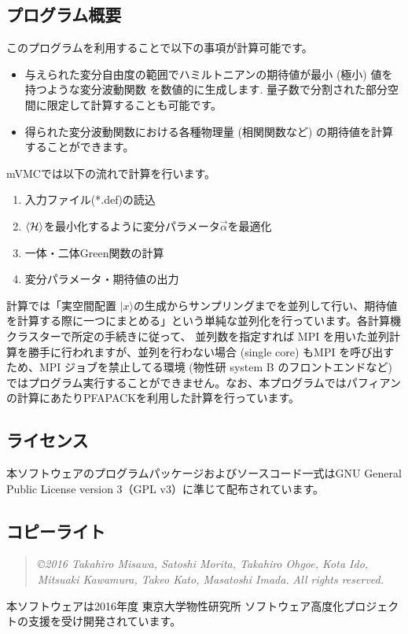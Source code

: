\subsection{プログラム概要}
このプログラムを利用することで以下の事項が計算可能です。
\begin{itemize}
\item{与えられた変分自由度の範囲でハミルトニアンの期待値が最小 (極小) 値を持つような変分波動関数 を数値的に生成します.   量子数で分割された部分空間に限定して計算することも可能です。}
\item{得られた変分波動関数における各種物理量 (相関関数など) の期待値を計算することができます。}
\end{itemize}
mVMCでは以下の流れで計算を行います。
\begin{enumerate}
\item{入力ファイル(*.def)の読込}
\item{$\langle {\cal H} \rangle$を最小化するように変分パラメータ$\vec{\alpha}$を最適化}
\item{一体・二体Green関数の計算}
\item{変分パラメータ・期待値の出力}
\end{enumerate}
計算では「実空間配置 $|x\rangle$の生成からサンプリングまでを並列して行い、期待値を計算する際に一つにまとめる」という単純な並列化を行っています。各計算機クラスターで所定の手続きに従って、 並列数を指定すれば MPI を用いた並列計算を勝手に行われますが、並列を行わない場合 (single core) もMPI を呼び出すため、MPI ジョブを禁止してる環境 (物性研 system B のフロントエンドなど) ではプログラム実行することができません。なお、本プログラムではパフィアンの計算にあたりPFAPACKを利用した計算を行っています\cite{PFAPACK}。

\subsection{ライセンス}
本ソフトウェアのプログラムパッケージおよびソースコード一式はGNU General Public License version 3（GPL v3）に準じて配布されています。

\subsection{コピーライト}
\begin{quote}
{\it \copyright  2016 Takahiro Misawa, Satoshi Morita, Takahiro Ohgoe, Kota Ido, Mitsuaki Kawamura, Takeo Kato, Masatoshi Imada.} {\it All rights reserved.}
\end{quote}
本ソフトウェアは2016年度 東京大学物性研究所 ソフトウェア高度化プロジェクトの支援を受け開発されています。

